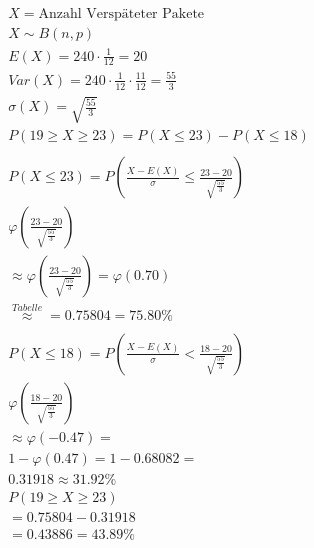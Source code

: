 \begin{align*}
    X = \text{Anzahl Verspäteter Pakete}                                                          \\
    X \sim B(n, p)                                                                                \\
    E(X) = 240 \cdot \frac{1}{12} = 20                                                            \\
    Var(X) = 240 \cdot \frac{1}{12} \cdot \frac{11}{12} = \frac{55}{3}                            \\
    \sigma(X) = \sqrt{\frac{55}{3}}                                                               \\
    P(19 \geq X \geq 23) = P(X \leq 23) - P(X \leq 18)                                            \\\\
    P(X \leq 23) = P\left(\frac{X - E(X)}{\sigma} \leq \frac{23 - 20}{\sqrt{\frac{55}{3}}}\right) \\
    \varphi\left(\frac{23 - 20}{\sqrt{\frac{55}{3}}}\right)                                       \\
    \approx \varphi\left(\frac{23 - 20}{\sqrt{\frac{55}{3}}}\right) = \varphi(0.70)               \\
    \overset{Tabelle}{\approx} = 0.75804 = 75.80\%                                                \\\\
    P(X \leq 18) = P\left(\frac{X - E(X)}{\sigma} < \frac{18 - 20}{\sqrt{\frac{55}{3}}}\right)    \\
    \varphi \left(\frac{18 - 20}{\sqrt{\frac{55}{3}}}\right)                                      \\
    \approx \varphi\left(-0.47\right) =                                                           \\
    1 - \varphi \left(0.47\right) = 1 - 0.68082 =                                                 \\
    0.31918 \approx 31.92\%                                                                       \\
    P(19 \geq X \geq 23)                                                                          \\
    = 0.75804 - 0.31918                                                                           \\
    = 0.43886 = 43.89\%
\end{align*}

